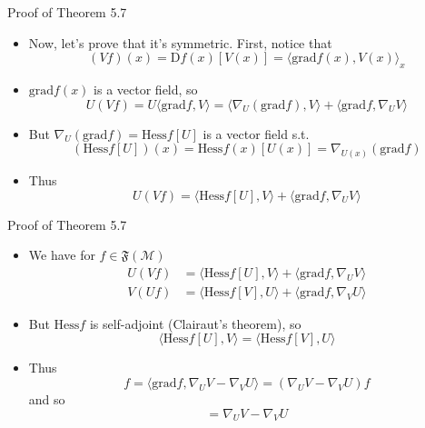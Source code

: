 \documentclass{beamer}
\begin{document}
\begin{frame}{Proof of Theorem 5.7}
    \begin{itemize}[<+->]
        \item Now, let's prove that it's symmetric. First, notice that 
        \begin{equation}
            (Vf)(x) = \text{D}f(x)[V(x)] = \langle \text{grad}f(x), V(x)\rangle_x 
        \end{equation}
        \item $\text{grad} f(x)$ is a vector field, so 
        \begin{equation}
            U(Vf)  = U\langle \text{grad}f, V\rangle = \langle \nabla_U (\text{grad} f), V\rangle + \langle \text{grad} f, \nabla_U V\rangle 
        \end{equation}
        \item But $\nabla_U (\text{grad} f) = \text{Hess}f[U]$ is a vector field s.t. 
        \begin{equation}
            (\text{Hess}f[U])(x) = \text{Hess}f(x)[U(x)] = \nabla_{U(x)}(\text{grad} f) 
        \end{equation}
        \item Thus 
        \begin{equation}
            U(Vf) = \langle \text{Hess}f[U], V\rangle + \langle \text{grad}f, \nabla_U V\rangle
        \end{equation}
    \end{itemize}
\end{frame}

\begin{frame}{Proof of Theorem 5.7}
    \begin{itemize}[<+->]
        \item We have for $f \in \mathfrak{F}(\mathcal{M})$
        \begin{align*}
            U(Vf) &= \langle \text{Hess}f[U], V\rangle + \langle \text{grad}f, \nabla_U V\rangle \\
            V(Uf) &= \langle \text{Hess}f[V], U\rangle + \langle \text{grad}f, \nabla_V U\rangle
        \end{align*}
        \item But $\text{Hess} f$ is self-adjoint (Clairaut's theorem), so
        \begin{equation}
            \langle \text{Hess}f[U], V\rangle = \langle \text{Hess}f[V], U\rangle
        \end{equation}
        \item Thus 
        \begin{equation}
            [U, V]f = \langle \text{grad} f, \nabla_U V - \nabla_V U\rangle = (\nabla_U V - \nabla_V U)f 
        \end{equation}
        and so 
        \begin{equation}
            [U, V] = \nabla_U V - \nabla_V U 
        \end{equation}
    \end{itemize}
\end{frame}
\end{document}
